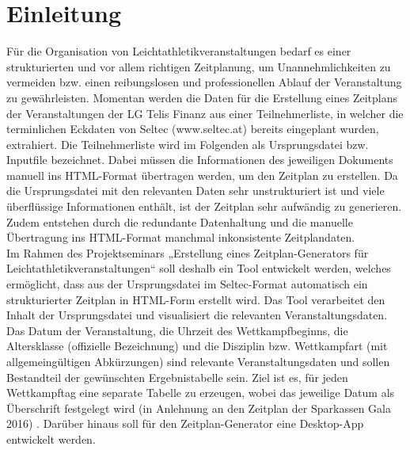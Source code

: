 
\chapter{Einleitung}
\label{chap:Einleitung}

Für die Organisation von Leichtathletikveranstaltungen bedarf es einer strukturierten und vor allem richtigen Zeitplanung, um Unannehmlichkeiten zu vermeiden bzw. einen reibungslosen und professionellen Ablauf der Veranstaltung zu gewährleisten. Momentan werden die Daten für die Erstellung eines Zeitplans der Veranstaltungen der LG Telis Finanz aus einer Teilnehmerliste, in welcher die terminlichen Eckdaten von Seltec (www.seltec.at) bereits eingeplant wurden, extrahiert. Die Teilnehmerliste wird im Folgenden als Ursprungsdatei bzw. Inputfile bezeichnet. Dabei müssen die Informationen des jeweiligen Dokuments manuell ins \ac{HTML}-Format übertragen werden, um den Zeitplan zu erstellen. Da die Ursprungsdatei mit den relevanten Daten sehr unstrukturiert ist und viele überflüssige Informationen enthält, ist der Zeitplan sehr aufwändig zu generieren. Zudem entstehen durch die redundante Datenhaltung und die manuelle Übertragung ins HTML-Format manchmal inkonsistente Zeitplandaten. \\
Im Rahmen des Projektseminars „Erstellung eines Zeitplan-Generators für Leichtathletikveranstaltungen“ soll deshalb ein Tool entwickelt werden, welches ermöglicht, dass aus der Ursprungsdatei im Seltec-Format automatisch ein strukturierter Zeitplan in HTML-Form erstellt wird. Das Tool verarbeitet den Inhalt der Ursprungsdatei und visualisiert die relevanten Veranstaltungsdaten. Das Datum der Veranstaltung, die Uhrzeit des Wettkampfbeginns, die Altersklasse (offizielle Bezeichnung) und die Disziplin bzw. Wettkampfart (mit allgemeingültigen Abkürzungen) sind relevante Veranstaltungsdaten und sollen Bestandteil der gewünschten Ergebnistabelle sein. Ziel ist es, für jeden Wettkampftag eine separate Tabelle zu erzeugen, wobei das jeweilige Datum als Überschrift festgelegt wird (in Anlehnung an den Zeitplan der Sparkassen Gala 2016) \cite{gala}.
Darüber hinaus soll für den Zeitplan-Generator eine Desktop-App entwickelt werden.\\
